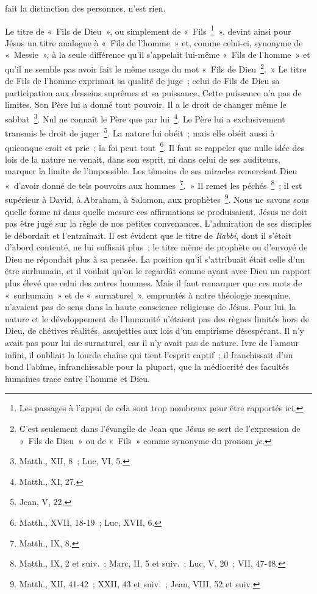 \documentclass[french,twoside]{book} %
\begin{document}
fait la distinction des personnes, n’est rien.\par
Le titre de « Fils de Dieu », ou simplement de « Fils \footnote{Les passages à l’appui de cela sont trop nombreux pour être rapportés ici.} », devint ainsi pour Jésus un titre analogue à « Fils de l’homme » et, comme celui-ci, synonyme de « Messie », à la seule différence qu’il s’appelait lui-même « Fils de l’homme » et qu’il ne semble pas avoir fait le même usage du mot « Fils de Dieu \footnote{ C’est seulement dans l’évangile de Jean que Jésus se sert de l’expression de « Fils de Dieu » ou de « Fils » comme synonyme du pronom {\itshape je}.}. » Le titre de Fils de l’homme exprimait sa qualité de juge ; celui de Fils de Dieu sa participation aux desseins suprêmes et sa puissance. Cette puissance n’a pas de limites. Son Père lui a donné tout pouvoir. Il a le droit de changer même le sabbat \footnote{Matth., XII, 8 ; Luc, VI, 5.}. Nul ne connaît le Père que par lui \footnote{Matth., XI, 27.}. Le Père lui a exclusivement transmis le droit de juger \footnote{Jean, V, 22.}. La nature lui obéit ; mais elle obéit aussi à quiconque croit et prie ; la foi peut tout \footnote{Matth., XVII, 18-19 ; Luc, XVII, 6.}. Il faut se rappeler que nulle idée des lois de la nature ne venait, dans son esprit, ni dans celui de ses auditeurs, marquer la limite de l’impossible. Les témoins de ses miracles remercient Dieu « d’avoir donné de tels pouvoirs aux hommes \footnote{Matth., IX, 8.}. » Il remet les péchés \footnote{Matth., IX, 2 et suiv. ; Marc, II, 5 et suiv. ; Luc, V, 20 ; VII, 47-48.} ; il est supérieur à David, à Abraham, à Salomon, aux prophètes \footnote{Matth., XII, 41-42 ; XXII, 43 et suiv. ; Jean, VIII, 52 et suiv.}. Nous ne savons sous quelle forme ni dans quelle mesure ces affirmations se produisaient. Jésus ne doit pas être jugé sur la règle de nos petites convenances. L’admiration de ses disciples le débordait et l’entraînait. Il est évident que le titre de {\itshape Rabbi}, dont il s’était d’abord contenté, ne lui suffisait plus ; le titre même de prophète ou d’envoyé de Dieu ne répondait plus à sa pensée. La position qu’il s’attribuait était celle d’un être surhumain, et il voulait qu’on le regardât comme ayant avec Dieu un rapport plus élevé que celui des autres hommes. Mais il faut remarquer que ces mots de « surhumain » et de « surnaturel », empruntés à notre théologie mesquine, n’avaient pas de sens dans la haute conscience religieuse de Jésus. Pour lui, la nature et le développement de l’humanité n’étaient pas des règnes limités hors de Dieu, de chétives réalités, assujetties aux lois d’un empirisme désespérant. Il n’y avait pas pour lui de surnaturel, car il n’y avait pas de nature. Ivre de l’amour infini, il oubliait la lourde chaîne qui tient l’esprit captif ; il franchissait d’un bond l’abîme, infranchissable pour la plupart, que la médiocrité des facultés humaines trace entre l’homme et Dieu.\par
\end{document}
